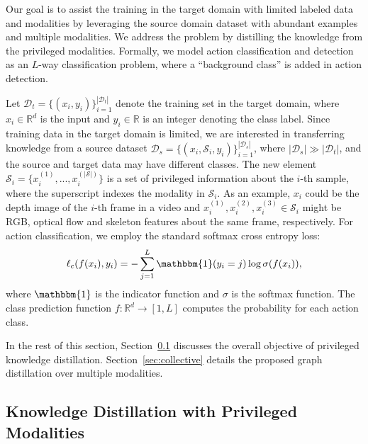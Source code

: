 Our goal is to assist the training in the target domain with limited labeled data and modalities by leveraging the source domain dataset with abundant examples and multiple modalities. We address the problem by distilling the knowledge from the privileged modalities. Formally, we model action classification and detection as an $L$-way classification problem, where a ``background class'' is added in action detection. 

Let $\mathcal{D}_{t} = \{(x_i, y_i)\}_{i=1}^{|\mathcal{D}_{t}|}$ denote the training set in the target domain, where $x_i\in\mathbb{R}^d$ is the input and $y_i\in\mathbb{R}$ is an integer denoting the class label. Since training data in the target domain is limited, we are interested in transferring knowledge from a source dataset $\mathcal{D}_{s} = \{(x_i, \mathcal{S}_i, y_i)\}_{i=1}^{|\mathcal{D}_{s}|}$, where $|\mathcal{D}_{s}| \gg |\mathcal{D}_{t}|$, and the source and target data may have different classes. The new element $\mathcal{S}_i = \{x_i^{(1)},...,x_i^{(|\mathcal{S}|)}\}$ is a set of privileged information about the $i$-th sample, where the superscript indexes the modality in $\mathcal{S}_i$. As an example, $x_i$ could be the depth image of the $i$-th frame in a video and $x_i^{(1)},x_i^{(2)},x_i^{(3)} \in \mathcal{S}_i$ might be RGB, optical flow and skeleton features about the same frame, respectively. For action classification, we employ the standard softmax cross entropy loss:
{\small
\begin{equation}
\label{eq:softmax_xentropy}
\ell_c(f(x_i), y_i) = -\sum_{j=1}^L \mathbbm{1}(y_i =j) \log \sigma(f(x_i)),
\end{equation}
}where $\mathbbm{1}$ is the indicator function and $\sigma$ is the softmax function. The class prediction function $f:\mathbb{R}^d \to [1,L]$ computes the probability for each action class.

In the rest of this section, Section~\ref{sec:previledged_knowledge_distilation} discusses the overall objective of privileged knowledge distillation. Section~\ref{sec:collective} details the proposed graph distillation over multiple modalities. 



\subsection{Knowledge Distillation with Privileged Modalities}\label{sec:previledged_knowledge_distilation}

